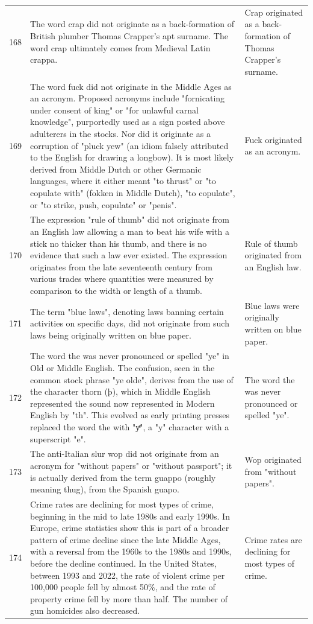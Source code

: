 \begin{tabular}{c|p{}|p{}}
168 & The word crap did not originate as a back-formation of British plumber Thomas Crapper's apt surname. The word crap ultimately comes from Medieval Latin crappa. & Crap originated as a back-formation of Thomas Crapper's surname. \\
169 & The word fuck did not originate in the Middle Ages as an acronym. Proposed acronyms include "fornicating under consent of king" or "for unlawful carnal knowledge", purportedly used as a sign posted above adulterers in the stocks. Nor did it originate as a corruption of "pluck yew" (an idiom falsely attributed to the English for drawing a longbow). It is most likely derived from Middle Dutch or other Germanic languages, where it either meant "to thrust" or "to copulate with" (fokken in Middle Dutch), "to copulate", or "to strike, push, copulate" or "penis". & Fuck originated as an acronym. \\
170 & The expression "rule of thumb" did not originate from an English law allowing a man to beat his wife with a stick no thicker than his thumb, and there is no evidence that such a law ever existed. The expression originates from the late seventeenth century from various trades where quantities were measured by comparison to the width or length of a thumb. & Rule of thumb originated from an English law. \\
171 & The term "blue laws", denoting laws banning certain activities on specific days, did not originate from such laws being originally written on blue paper. & Blue laws were originally written on blue paper. \\
172 & The word the was never pronounced or spelled "ye" in Old or Middle English. The confusion, seen in the common stock phrase "ye olde", derives from the use of the character thorn (þ), which in Middle English represented the sound now represented in Modern English by "th". This evolved as early printing presses replaced the word the with "yͤ", a "y" character with a superscript "e". & The word the was never pronounced or spelled "ye". \\
173 & The anti-Italian slur wop did not originate from an acronym for "without papers" or "without passport"; it is actually derived from the term guappo (roughly meaning thug), from the Spanish guapo. & Wop originated from "without papers". \\
174 & Crime rates are declining for most types of crime, beginning in the mid to late 1980s and early 1990s. In Europe, crime statistics show this is part of a broader pattern of crime decline since the late Middle Ages, with a reversal from the 1960s to the 1980s and 1990s, before the decline continued. In the United States, between 1993 and 2022, the rate of violent crime per 100,000 people fell by almost 50\%, and the rate of property crime fell by more than half. The number of gun homicides also decreased. & Crime rates are declining for most types of crime. \\

\end{tabular}
